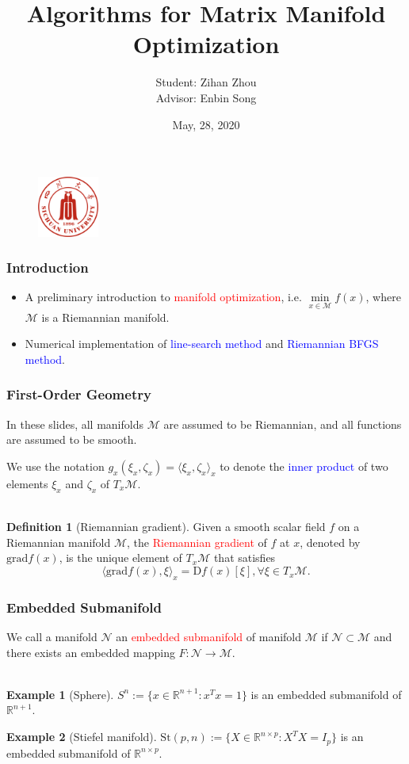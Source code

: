 \documentclass[notheorems,envcountsect,pdfpagemode=FullScreen,12pt]{beamer}
\title{Algorithms for Matrix Manifold Optimization}
\author[Zihan Zhou]{Student: Zihan Zhou\texorpdfstring{\\ Advisor: Enbin Song}{}}
\institute[Sichuan University]{{\large Sichuan University}}
\date{May, 28, 2020}
\theoremstyle{plain}
\theoremstyle{definition}
\newtheorem{defin}{Definition}
\theoremstyle{example}
\newtheorem{example}{Example}
\begin{document}
\begin{frame}
\maketitle
\begin{figure}[ht]
\centering
\includegraphics[height=2cm]{sculogo.png}
\end{figure}
\end{frame}

\begin{frame}
\frametitle{Introduction}
\begin{itemize}
\item A preliminary introduction to \textcolor{red}{manifold optimization}, i.e.
$\min\limits_{x\in\mathcal{M}}f(x)$, where $\mathcal{M}$ is a Riemannian manifold.
\item Numerical implementation of \textcolor{blue}{line-search method} and \textcolor{blue}{Riemannian BFGS method}.
\end{itemize}
\end{frame}

\begin{frame}
\frametitle{First-Order Geometry}
\quad In these slides, all manifolds $\mathcal{M}$ are assumed to be Riemannian, and all functions are assumed to be smooth.\par
\quad We use the notation $g_x(\xi_x,\zeta_x)=\langle\xi_x,\zeta_x\rangle_x$ to denote the \textcolor{blue}{inner product} of two elements $\xi_x$ and $\zeta_x$ of $T_x\mathcal{M}$.
\\~\\
\begin{defin}[Riemannian gradient]
Given a smooth scalar field $f$ on a Riemannian manifold $\mathcal{M}$, the \textcolor{red}{Riemannian gradient} of $f$ at $x$, denoted by $\mathrm{grad}f(x)$, is the unique element of $T_x\mathcal{M}$ that satisfies
$$\langle\mathrm{grad}f(x),\xi\rangle_x=\mathrm{D}f(x)[\xi], \forall \xi\in T_x\mathcal{M}.$$
\end{defin}
\end{frame}

\begin{frame}
\frametitle{Embedded Submanifold}
\quad We call a manifold $\mathcal{N}$ an \textcolor{red}{embedded submanifold} of manifold $\mathcal{M}$ if $\mathcal{N}\subset\mathcal{M}$ and there exists an embedded mapping $F:\mathcal{N}\to\mathcal{M}$.
\\~\\
\begin{example}[Sphere]
$S^n:=\{x\in\mathbb{R}^{n+1}:x^Tx=1\}$ is an embedded submanifold of $\mathbb{R}^{n+1}$.
\end{example}
\begin{example}[Stiefel manifold]
$\mathrm{St}(p,n):=\{X\in\mathbb{R}^{n\times p}:X^TX=I_p\}$ is an embedded submanifold of $\mathbb{R}^{n\times p}$. 
\end{example}
\end{frame}
\end{document}
